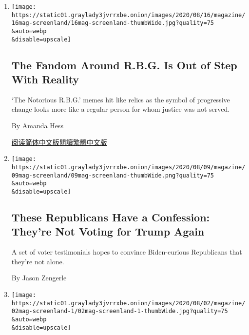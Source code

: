 \begin{enumerate}
\def\labelenumi{\arabic{enumi}.}
\item
  \href{/2020/08/12/magazine/the-fandom-around-rbg-is-out-of-step-with-reality.html}{}

  \texttt{[image: https://static01.graylady3jvrrxbe.onion/images/2020/08/16/magazine/16mag-screenland/16mag-screenland-thumbWide.jpg?quality=75\\\&auto=webp\\\&disable=upscale]}

  \hypertarget{the-fandom-around-rbg-is-out-of-step-with-reality}{%
  \subsection{The Fandom Around R.B.G. Is Out of Step With
  Reality}\label{the-fandom-around-rbg-is-out-of-step-with-reality}}

  `The Notorious R.B.G.' memes hit like relics as the symbol of
  progressive change looks more like a regular person for whom justice
  was not served.

  By Amanda Hess

  \href{https://cn.nytimes3xbfgragh.onion/culture/20200814/the-fandom-around-rbg-is-out-of-step-with-reality/}{阅读简体中文版}\href{https://cn.nytimes3xbfgragh.onion/culture/20200814/the-fandom-around-rbg-is-out-of-step-with-reality/zh-hant/}{閱讀繁體中文版}
\item
  \href{/2020/08/05/magazine/republicans-confess-against-trump.html}{}

  \texttt{[image: https://static01.graylady3jvrrxbe.onion/images/2020/08/09/magazine/09mag-screenland/09mag-screenland-thumbWide.png?quality=75\\\&auto=webp\\\&disable=upscale]}

  \hypertarget{these-republicans-have-a-confession-theyre-not-voting-for-trump-again}{%
  \subsection{These Republicans Have a Confession: They're Not Voting
  for Trump
  Again}\label{these-republicans-have-a-confession-theyre-not-voting-for-trump-again}}

  A set of voter testimonials hopes to convince Biden-curious
  Republicans that they're not alone.

  By Jason Zengerle
\item
  \href{/2020/07/29/magazine/i-may-destroy-you-hbo-michaela-coel.html}{}

  \texttt{[image: https://static01.graylady3jvrrxbe.onion/images/2020/08/02/magazine/02mag-screenland-1/02mag-screenland-1-thumbWide.jpg?quality=75\\\&auto=webp\\\&disable=upscale]}


\end{enumerate}
